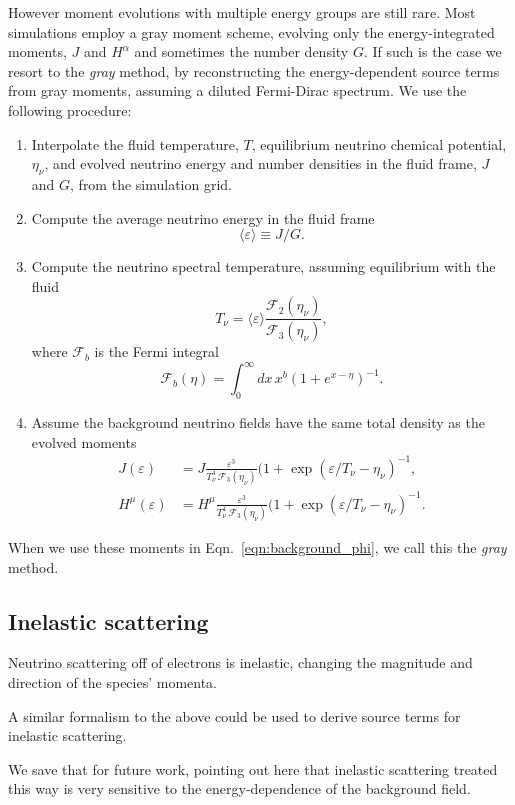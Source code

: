 \documentclass[aps,floatfix,prd,superscriptaddress,twocolumn]{revtex4-1}
\newcommand{\todo}[1]{\marginpar{\tiny{\textcolor{red}{#1}}}}
\renewcommand\todo[1]{} %
\begin{document}
However moment evolutions with multiple energy groups are still rare.
Most simulations employ a gray moment scheme,
evolving only the energy-integrated moments, $J$ and $H^\alpha$
and sometimes the number density $G$.
If such is the case we resort to the \emph{gray} method,
by reconstructing the energy-dependent source terms
from gray moments, assuming a diluted Fermi-Dirac spectrum.
We use the following procedure:
\begin{enumerate}
\item
  Interpolate the fluid temperature, $T$,
  equilibrium neutrino chemical potential, $\eta_\nu$,
  and evolved neutrino energy and number densities in the fluid frame,
  $J$ and $G$, from the simulation grid.
\item
  Compute the average neutrino energy in the fluid frame
  \begin{equation}
    \langle \varepsilon \rangle \equiv J/G.
  \end{equation}
\item
  Compute the neutrino spectral temperature, assuming equilibrium with the
  fluid
  \begin{equation}
    \label{eqn:spectral_temp}
    T_\nu = \langle \varepsilon \rangle
    \frac{\mathscr{F}_2(\eta_\nu)}{\mathscr{F}_3(\eta_\nu)},
  \end{equation}
  where $\mathscr{F}_b$ is the Fermi integral
  \begin{equation}
    \label{eqn:fermi_integral}
    \mathscr{F}_b(\eta) = \int_0^\infty dx \, x^b (1+e^{x-\eta})^{-1}.
  \end{equation}
\item
  Assume the background neutrino fields have the same total density
  as the evolved moments
  \begin{align}
    \label{eqn:J_from_gray}
    J(\varepsilon) &=
    J \frac{\varepsilon^3}{T_\nu^4 \,\mathscr{F}_3(\eta_\nu)}
    (1+\exp(\varepsilon/T_\nu-\eta_\nu)^{-1}, \\
    \label{eqn:H_from_gray}
    H^\mu(\varepsilon) &=
    H^\mu \frac{\varepsilon^3}{T_\nu^4\, \mathscr{F}_3(\eta_\nu)}
    (1+\exp(\varepsilon/T_\nu-\eta_\nu)^{-1}.
  \end{align}
\end{enumerate}
When we use these moments in Eqn.~\ref{eqn:background_phi},
we call this the \emph{gray} method.

\subsection{Inelastic scattering}
\label{ssec:sources_si}
Neutrino scattering off of electrons is inelastic, changing the
magnitude and direction of the species' momenta.
\todo{cite \cite{keil2003-pinched_spectra} or someone}
A similar formalism to the above could be used to derive source terms
for inelastic scattering.
\todo{compare relative amounts of inelastic to elastic scattering}
We save that for future work, pointing out here that inelastic scattering
treated this way is very sensitive to the energy-dependence of
the background field.
\end{document}
